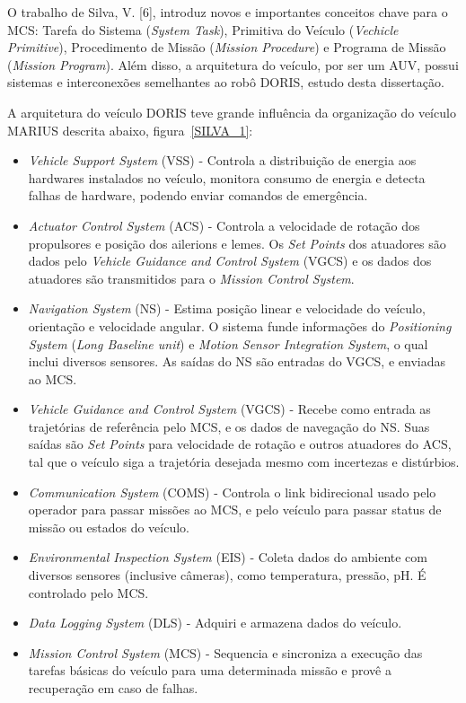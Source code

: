 O trabalho de Silva, V. [6], introduz novos e importantes conceitos chave para o
MCS: Tarefa do Sistema (\emph{System Task}), Primitiva do
Veículo (\emph{Vechicle Primitive}), Procedimento de Missão (\emph{Mission Procedure})
e Programa de Missão (\emph{Mission Program}). Além disso, a arquitetura do
veículo, por ser um AUV, possui sistemas e interconexões
semelhantes ao robô DORIS, estudo desta dissertação.

A arquitetura do veículo DORIS teve grande influência da organização do veículo
MARIUS descrita abaixo, figura~\ref{SILVA_1}:
\begin{itemize}
  \item \emph{Vehicle Support System} (VSS) - Controla a distribuição de energia
  aos hardwares instalados no veículo, monitora consumo de energia e detecta
  falhas de hardware, podendo enviar comandos de emergência.
  \item \emph{Actuator Control System} (ACS) - Controla a velocidade de rotação
  dos propulsores e posição dos ailerions e lemes. Os \emph{Set Points} dos
  atuadores são dados pelo \emph{Vehicle Guidance and Control System} (VGCS) e
  os dados dos atuadores são transmitidos para o \emph{Mission Control System}.
  \item \emph{Navigation System} (NS) - Estima posição linear e velocidade do
  veículo, orientação e velocidade angular. O sistema funde informações do
  \emph{Positioning System} (\emph{Long Baseline unit}) e \emph{Motion Sensor
  Integration System}, o qual inclui diversos sensores. As saídas do NS são
  entradas do VGCS, e enviadas ao MCS.
  \item \emph{Vehicle Guidance and Control System} (VGCS) - Recebe como entrada
  as trajetórias de referência pelo MCS, e os dados de navegação do NS. Suas
  saídas são \emph{Set Points} para velocidade de rotação e outros atuadores do
  ACS, tal que o veículo siga a trajetória desejada mesmo com incertezas e
  distúrbios.
  \item \emph{Communication System} (COMS) - Controla o link bidirecional usado
  pelo operador para passar missões ao MCS, e pelo veículo para passar status de
  missão ou estados do veículo.
  \item \emph{Environmental Inspection System} (EIS) - Coleta dados do ambiente
  com diversos sensores (inclusive câmeras), como temperatura, pressão, pH. É
  controlado pelo MCS.
  \item \emph{Data Logging System} (DLS) - Adquiri e armazena dados do veículo.
  \item \emph{Mission Control System} (MCS) - Sequencia e sincroniza a execução
  das tarefas básicas do veículo para uma determinada missão e provê a
  recuperação em caso de falhas.
\end{itemize}

